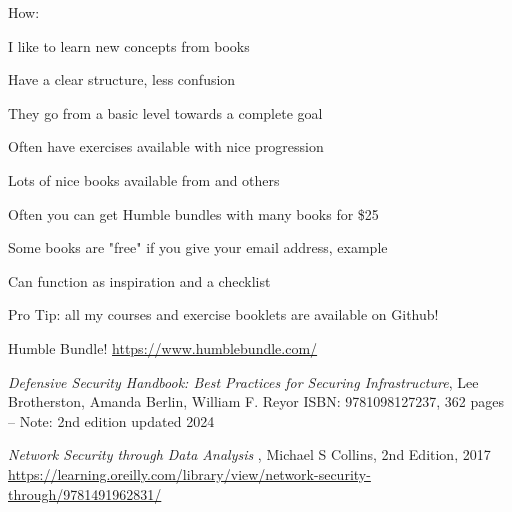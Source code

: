 \documentclass[Screen16to9,17pt]{foils}
\begin{document}


How:

I like to learn new concepts from books
\begin{list2}
\item Have a clear structure, less confusion
\item They go from a basic level towards a complete goal
\item Often have exercises available with nice progression
\item Lots of nice books available from  and others
\item Often you can get Humble bundles with many books for \$25
\item Some books are "free" if you give your email address, example
\item Can function as inspiration and a checklist
\end{list2}

Pro Tip: all my courses and exercise booklets are available on Github!

Humble Bundle! \url{https://www.humblebundle.com/}





\emph{Defensive Security Handbook: Best Practices for Securing Infrastructure}, Lee Brotherston, Amanda Berlin, William F. Reyor ISBN: 9781098127237, 362 pages -- Note: 2nd edition updated 2024\\
{\footnotesize{}}




\emph{Network Security through Data Analysis }, Michael S Collins, 2nd Edition, 2017\\
{\footnotesize\url{https://learning.oreilly.com/library/view/network-security-through/9781491962831/}}



\end{document}

